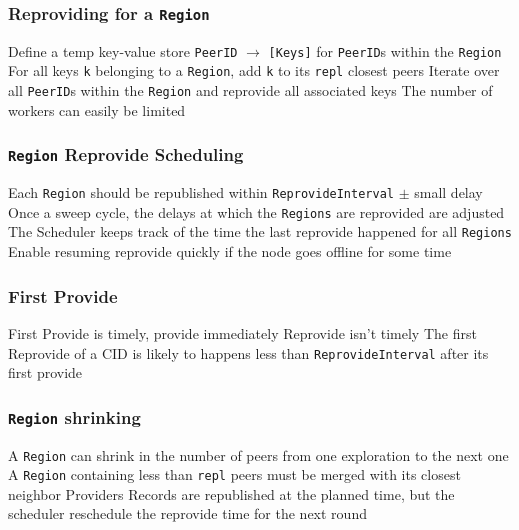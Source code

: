 \documentclass{../pl-slide}
\begin{document}
\begin{frame}
\frametitle{Reproviding for a \texttt{Region}}

\begin{itemize}
	\itemc Define a temp key-value store \texttt{PeerID} $\xrightarrow{}$ \texttt{[Keys]} for \texttt{PeerID}s within the \texttt{Region}
	\itemc For all keys \texttt{k} belonging to a \texttt{Region}, add \texttt{k} to its \texttt{repl} closest peers
	\itemc Iterate over all \texttt{PeerID}s within the \texttt{Region} and reprovide all associated keys
	\itemc The number of workers can easily be limited
\end{itemize}
\end{frame}

\begin{frame}
\frametitle{\texttt{Region} Reprovide Scheduling}

\begin{itemize}
	\itemc Each \texttt{Region} should be republished within \texttt{ReprovideInterval} $\pm$ small delay
	\itemc Once a sweep cycle, the delays at which the \texttt{Regions} are reprovided are adjusted
	\itemc The Scheduler keeps track of the time the last reprovide happened for all \texttt{Regions}
	\itemc Enable resuming reprovide quickly if the node goes offline for some time
\end{itemize}
\end{frame}


\begin{frame}
\frametitle{First Provide}

\begin{itemize}
	\itemc First Provide is timely, provide immediately
	\itemc Reprovide isn't timely
	\itemc The first Reprovide of a CID is likely to happens less than \texttt{ReprovideInterval} after its first provide
\end{itemize}
\end{frame}

\begin{frame}
\frametitle{\texttt{Region} shrinking}

\begin{itemize}
	\itemc A \texttt{Region} can shrink in the number of peers from one exploration to the next one
	\itemc A \texttt{Region} containing less than \texttt{repl} peers  must be merged with its closest neighbor
	\itemc Providers Records are republished at the planned time, but the scheduler reschedule the reprovide time for the next round
\end{itemize}

\end{frame}
\end{document}

